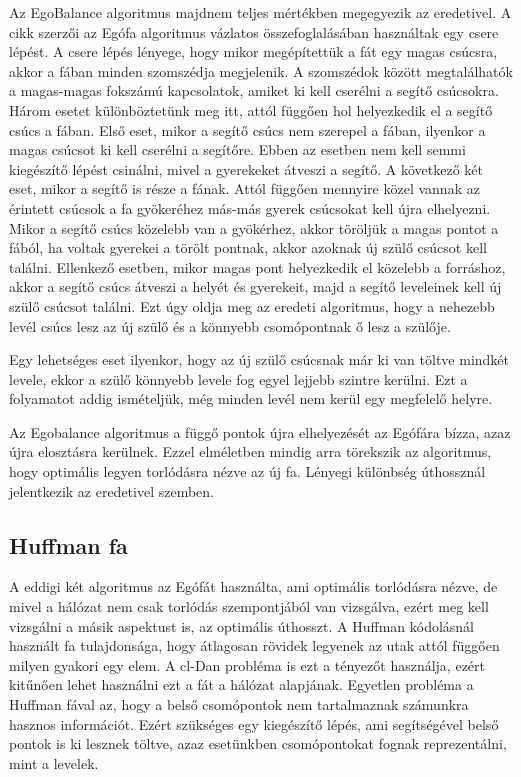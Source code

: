 \documentclass[12pt]{report}
\begin{document}
Az EgoBalance algoritmus majdnem teljes mértékben megegyezik az eredetivel.
A cikk szerzői az Egófa algoritmus vázlatos összefoglalásában használtak egy csere lépést.
A csere lépés lényege, hogy mikor megépítettük a fát egy magas csúcsra, akkor a fában minden szomszédja megjelenik.
A szomszédok között megtalálhatók a magas-magas fokszámú kapcsolatok, amiket ki kell cserélni a segítő csúcsokra.
Három esetet különböztetünk meg itt, attól függően hol helyezkedik el a segítő csúcs a fában.
Első eset, mikor a segítő csúcs nem szerepel a fában, ilyenkor a magas csúcsot ki kell cserélni a segítőre. Ebben az esetben nem kell semmi kiegészítő lépést csinálni, mivel a gyerekeket átveszi a segítő.
A következő két eset, mikor a segítő is része a fának. 
Attól függően mennyire közel vannak az érintett csúcsok a fa gyökeréhez más-más gyerek csúcsokat kell újra elhelyezni.
Mikor a segítő csúcs közelebb van a gyökérhez, akkor töröljük a magas pontot a fából, ha voltak gyerekei a törölt pontnak, akkor azoknak új szülő csúcsot kell találni.
Ellenkező esetben, mikor magas pont helyezkedik el közelebb a forráshoz, akkor a segítő csúcs átveszi a helyét és gyerekeit, majd a segítő leveleinek kell új szülő csúcsot találni. 
Ezt úgy oldja meg az eredeti algoritmus, hogy a nehezebb levél csúcs lesz az új szülő és a könnyebb csomópontnak ő lesz a szülője.

\pagebreak

Egy lehetséges eset ilyenkor, hogy az új szülő csúcsnak már ki van töltve mindkét levele, ekkor a szülő könnyebb levele fog egyel lejjebb szintre kerülni.
Ezt a folyamatot addig ismételjük, még minden levél nem kerül egy megfelelő helyre.

Az Egobalance algoritmus a függő pontok újra elhelyezését az Egófára bízza, azaz újra elosztásra kerülnek.
Ezzel elméletben mindig arra törekszik az algoritmus, hogy optimális legyen torlódásra nézve az új fa.
Lényegi különbség úthossznál jelentkezik az eredetivel szemben.

\subsection{Huffman fa}

A eddigi két algoritmus az Egófát \cite{avin_demand-aware_nodate} használta, ami optimális torlódásra nézve, de mivel a hálózat nem csak torlódás szempontjából van vizsgálva, ezért meg kell vizsgálni a másik aspektust is, az optimális úthosszt.
A Huffman kódolásnál \cite{huf52} használt fa tulajdonsága, hogy átlagosan rövidek legyenek az utak attól függően milyen gyakori egy elem.
A cl-Dan probléma is ezt a tényezőt használja, ezért kitűnően lehet használni ezt a fát a hálózat alapjának.
Egyetlen probléma a Huffman fával az, hogy a belső csomópontok nem tartalmaznak számunkra hasznos információt.
Ezért szükséges egy kiegészítő lépés, ami segítségével belső pontok is ki lesznek töltve, azaz esetünkben csomópontokat fognak reprezentálni, mint a levelek.
\end{document}
